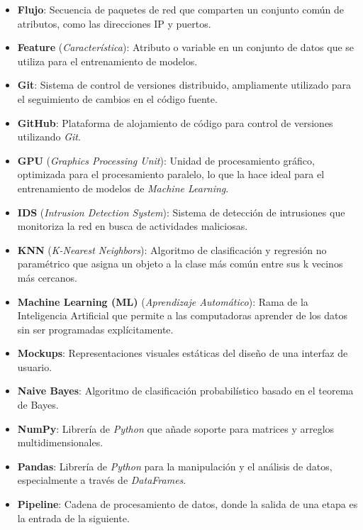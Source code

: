 \begin{itemize}
\item \textbf{Flujo}: Secuencia de paquetes de red que comparten un conjunto común de atributos, como las direcciones IP y puertos.
\item \textbf{Feature} (\textit{Característica}): Atributo o variable en un conjunto de datos que se utiliza para el entrenamiento de modelos.

\item \textbf{Git}: Sistema de control de versiones distribuido, ampliamente utilizado para el seguimiento de cambios en el código fuente.
\item \textbf{GitHub}: Plataforma de alojamiento de código para control de versiones utilizando \textit{Git}.
\item \textbf{GPU} (\textit{Graphics Processing Unit}): Unidad de procesamiento gráfico, optimizada para el procesamiento paralelo, lo que la hace ideal para el entrenamiento de modelos de \textit{Machine Learning}.
\item \textbf{IDS} (\textit{Intrusion Detection System}): Sistema de detección de intrusiones que monitoriza la red en busca de actividades maliciosas.

\item \textbf{KNN} (\textit{K-Nearest Neighbors}): Algoritmo de clasificación y regresión no paramétrico que asigna un objeto a la clase más común entre sus k vecinos más cercanos.

\item \textbf{Machine Learning (ML)} (\textit{Aprendizaje Automático}): Rama de la Inteligencia Artificial que permite a las computadoras aprender de los datos sin ser programadas explícitamente.

\item \textbf{Mockups}: Representaciones visuales estáticas del diseño de una interfaz de usuario.

\item \textbf{Naive Bayes}: Algoritmo de clasificación probabilístico basado en el teorema de Bayes.

\item \textbf{NumPy}: Librería de \textit{Python} que añade soporte para matrices y arreglos multidimensionales.

\item \textbf{Pandas}: Librería de \textit{Python} para la manipulación y el análisis de datos, especialmente a través de \textit{DataFrames}.

\item \textbf{Pipeline}: Cadena de procesamiento de datos, donde la salida de una etapa es la entrada de la siguiente.


\end{itemize}
